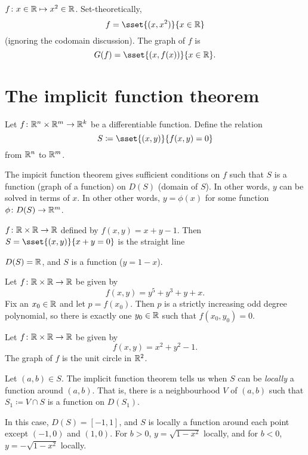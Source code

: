 \begin{example}
    $f\colon x \in \mathbb{R} \mapsto x^2 \in \mathbb{R}$.
    Set-theoretically, \[
        f = \sset{(x, x^2)}{x \in \R}
    \] (ignoring the codomain discussion).
    The graph of $f$ is \[
        G(f) = \sset{(x, f(x))}{x \in \R}.
    \]
\end{example}

\section{The implicit function theorem} \label{sec:imft}
Let $f\colon \mathbb{R}^n \times \mathbb{R}^m \to \mathbb{R}^k$ be a differentiable function.
Define the relation \[
    S \coloneq \sset{(x, y)}{f(x, y) = 0}
\] from $\mathbb{R}^n$ to $\mathbb{R}^m$.

The impicit function theorem gives sufficient conditions on $f$ such that
$S$ is a function (graph of a function) on $D(S)$ (domain of $S$).
In other words, $y$ can be solved in terms of $x$.
In other other words, $y = \phi(x)$ for some function
$\phi\colon D(S) \to \mathbb{R}^m$.

\begin{examples}
    \item $f\colon \mathbb{R} \times \mathbb{R} \to \mathbb{R}$ defined by $f(x, y) = x + y - 1$.
    Then $S = \sset{(x, y)}{x + y = 0}$ is the straight line
    \begin{center}
    \end{center}
    $D(S) = \mathbb{R}$, and $S$ is a function ($y = 1 - x$).
    \item Let $f\colon \mathbb{R} \times \mathbb{R} \to \mathbb{R}$ be given by \[
        f(x, y) = y^5 + y^3 + y + x.
    \] Fix an $x_0 \in \mathbb{R}$ and let $p = f(x_0)$.
    Then $p$ is a strictly increasing odd degree polynomial, so there is
    exactly one $y_0 \in \mathbb{R}$ such that $f(x_0, y_0) = 0$.
    \item Let $f\colon \mathbb{R} \times \mathbb{R} \to \mathbb{R}$ be given by \[
        f(x, y) = x^2 + y^2 - 1.
    \] The graph of $f$ is the unit circle in $\mathbb{R}^2$.
    \begin{center}
    \end{center}
    Let $(a, b) \in S$.
    The implicit function theorem tells us when $S$ can be \emph{locally} a
    function around $(a, b)$.
    That is, there is a neighbourhood $V$ of $(a, b)$ such that
    $S_1 \coloneq V \cap S$ is a function on $D(S_1)$.

    In this case, $D(S) = [-1, 1]$, and $S$ is locally a function around
    each point except $(-1, 0)$ and $(1, 0)$.
    For $b > 0$, $y = \sqrt{1 - x^2}$ locally, and for $b < 0$,
    $y = -\sqrt{1 - x^2}$ locally.
\end{examples}

